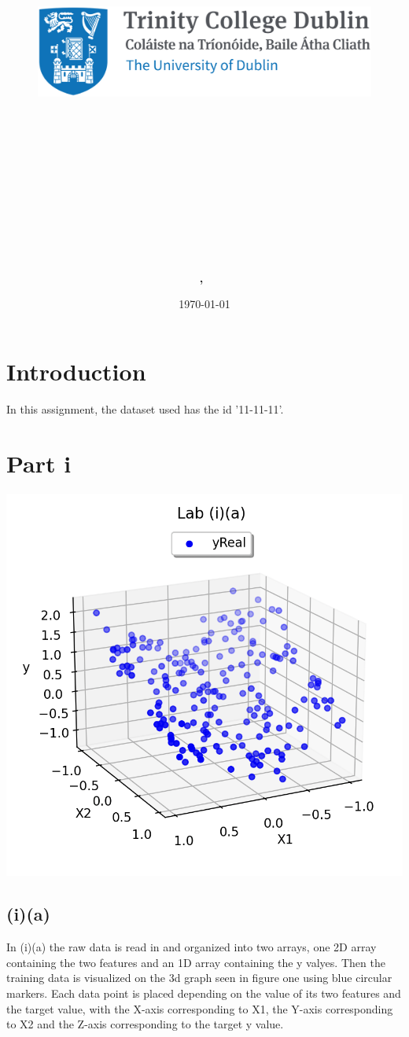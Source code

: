 \documentclass{article}
\title{
\vspace{-1in}
\begin{figure}[!ht]
\flushleft
\includegraphics[width=0.4\linewidth]{reduced-trinity.png}
\end{figure}
\vspace{-0.5cm}
\hrulefill \\
\vspace{0.5cm}
\textmd{\textbf{\moduleCode\ \moduleName}}\\
\textmd{\textbf{\assignmentTitle}}\\
\vspace{0.5cm}
\hrulefill \\
}
\author{\textbf{\authorName,\ \authorID}}
\date{\today}
\begin{document}
\captionsetup{width=.8\linewidth} 

\maketitle


\section{Introduction}
In this assignment, the dataset used has the id '11-11-11'.

\section{Part i }
\begin{center}
\includegraphics[width=.6\linewidth]{ia.png}
\end{center}

\subsection{(i)(a)}
In (i)(a) the raw data is read in and organized into two arrays, one 2D array containing the two features and an 1D array containing the y valyes. Then the training data is visualized on the 3d graph seen in figure one using blue circular markers. Each data point is placed depending on the value of its two features and the target value, with the X-axis corresponding to X1, the Y-axis corresponding to X2 and the Z-axis corresponding to the target y value.
\end{document}
